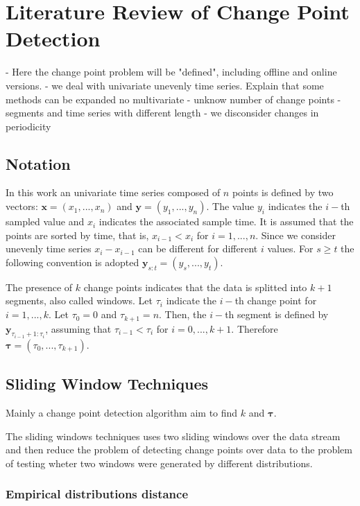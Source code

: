 \chapter{Literature Review of Change Point Detection} 

- Here the change point problem will be "defined", including offline and online versions.
- we deal with univariate unevenly time series. Explain that some methods can be expanded no multivariate
- unknow number of change points
- segments and time series with different length
- we disconsider changes in periodicity

\section{Notation}

In this work an univariate time series composed of $n$ points is defined by two vectors: $\mathbf{x} = (x_{1}, ..., x_{n})$ and $\mathbf{y} = (y_{1}, ..., y_{n})$. The value $y_{i}$ indicates the $i-$th sampled value and $x_{i}$ indicates the associated sample time. It is assumed that the points are sorted by time, that is, $x_{i - 1} < x_{i}$ for $i = 1, ..., n$. Since we consider unevenly time series $x_{i} - x_{i - 1}$ can be different for different $i$ values. For $s \ge t$ the following convention is adopted $\mathbf{y}_{s:t} = (y_{s}, ..., y_{t})$.

The presence of $k$ change points indicates that the data is splitted into $k+1$ segments, also called windows. Let $\tau_{i}$ indicate the $i-$th change point for $i=1,...,k$. Let $\tau_{0} = 0$ and $\tau_{k + 1} = n$. Then, the $i-$th segment is defined by $\mathbf{y}_{\tau_{i - 1} + 1 : \tau_{i}}$, assuming that $\tau_{i - 1} < \tau_{i}$ for $i = 0, ..., k + 1$. Therefore $\boldsymbol \tau = (\tau_{0}, ..., \tau_{k + 1})$.

\section{Sliding Window Techniques}

Mainly a change point detection algorithm aim to find $k$ and $\boldsymbol \tau$.

The sliding windows techniques uses two sliding windows over the data stream and then reduce the problem of detecting change points over data to the problem of testing wheter two windows were generated by different distributions.

\subsection{Empirical distributions distance}

